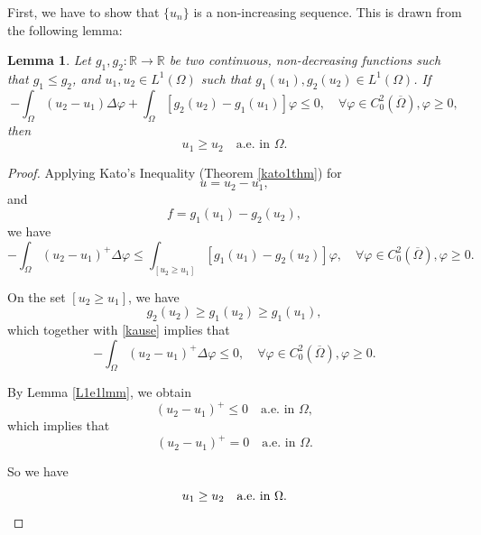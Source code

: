 \documentclass[a4paper, 11pt]{report}
\newtheorem{lmm}{Lemma}[chapter]
\theoremstyle{definition}\newtheorem*{rmk}{Remark}
\begin{document}
First, we have to show that $\{u_n\}$ is a non-increasing sequence. This is drawn from the following lemma:

\begin{lmm}\label{cmplmm}
Let $g_1, g_2:\mathbb{R}\to\mathbb{R}$ be two continuous, non-decreasing functions such that $g_1 \le g_2$, and $u_1, u_2 \in L^1(\Omega)$ such that $g_1(u_1), g_2(u_2)\in L^1(\Omega)$. If
\[
-\int_{\Omega}(u_2 - u_1)\Delta \varphi + \int_{\Omega}[g_2(u_2)-g_1(u_1)]\varphi \le 0 ,\quad \forall \varphi \in C^2_0(\overline{\Omega}),\varphi\ge 0,
\]
then
\[
u_1 \ge u_2 \quad \text{a.e.\ in } \Omega.
\]
\end{lmm}

\begin{proof}
\mbox{}

Applying Kato's Inequality (Theorem \ref{kato1thm}) for 
\[
u = u_2 - u_1,
\]
and
\[
f = g_1(u_1) - g_2(u_2),
\]
we have
\begin{equation}\label{kause}
-\int_{\Omega}(u_2 - u_1)^+\Delta \varphi \le \int_{[u_2\ge u_1]}[g_1(u_1)-g_2(u_2)]\varphi ,\quad \forall \varphi \in C^2_0(\overline{\Omega}),\varphi\ge 0.
\end{equation}

On the set $[u_2 \ge u_1]$, we have
\[
g_2(u_2) \ge g_1(u_2) \ge g_1(u_1),
\]
which together with \eqref{kause} implies that
\[
-\int_{\Omega}(u_2 - u_1)^+\Delta \varphi \le 0 ,\quad \forall \varphi \in C_0^2(\overline{\Omega}),\varphi \ge 0.
\]

By Lemma \ref{L1e1lmm}, we obtain
\[
(u_2 - u_1)^+ \le 0 \quad \text{a.e.\ in } \Omega,
\]
which implies that
\[
(u_2 - u_1)^+ = 0 \quad \text{a.e.\ in }\Omega.
\]

So we have
\[
u_1 \ge u_2 \quad \text{a.e.\ in }\Omega.\qedhere
\]
\end{proof}
\end{document}

